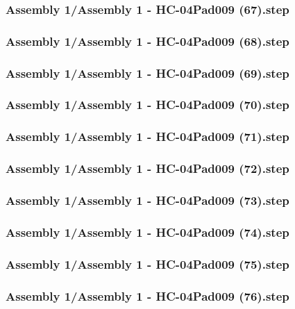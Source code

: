 \documentclass[a4paper,12pt]{article}
\begin{document}
\subsubsection{Assembly 1/Assembly 1 - HC-04Pad009 (67).step}

\subsubsection{Assembly 1/Assembly 1 - HC-04Pad009 (68).step}

\subsubsection{Assembly 1/Assembly 1 - HC-04Pad009 (69).step}

\subsubsection{Assembly 1/Assembly 1 - HC-04Pad009 (70).step}

\subsubsection{Assembly 1/Assembly 1 - HC-04Pad009 (71).step}

\subsubsection{Assembly 1/Assembly 1 - HC-04Pad009 (72).step}

\subsubsection{Assembly 1/Assembly 1 - HC-04Pad009 (73).step}

\subsubsection{Assembly 1/Assembly 1 - HC-04Pad009 (74).step}

\subsubsection{Assembly 1/Assembly 1 - HC-04Pad009 (75).step}

\subsubsection{Assembly 1/Assembly 1 - HC-04Pad009 (76).step}

\end{document}

